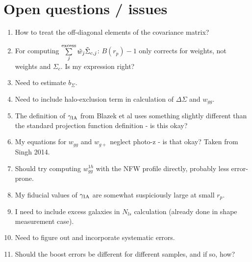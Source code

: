 \documentclass[onecolumn,amsmath,aps,fleqn, superscriptaddress]{revtex4}
\begin{document}
\section{Open questions / issues}
\begin{enumerate}
\item{How to treat the off-diagonal elements of the covariance matrix?}
\item{For computing $\sum\limits_{j}^{\rm excess} \tilde{w}_j \tilde{\Sigma}_{c,j}$: $B(r_p) - 1$ only corrects for weights, not weights and $\Sigma_c$. Is my expression right?}
\item{Need to estimate $b_{\Sigma}$.}
\item{Need to include halo-exclusion term in calculation of $\Delta \Sigma$ and $w_{gg}$.}
\item{The definition of $\gamma_{\rm IA}$ from Blazek et al uses something slightly different than the standard projection function definition - is this okay?}
\item{My equations for $w_{gg}$ and $w_{g+}$ neglect photo-z - is that okay? Taken from Singh 2014.}
\item{Should try computing $w_{gg}^{1h}$ with the NFW profile directly, probably less error-prone.}
\item{My fiducial values of $\gamma_{\rm IA}$ are somewhat suspiciously large at small $r_p$.}
\item{I need to include excess galaxies in $N_{ls}$ calculation (already done in shape measurement case).}
\item{Need to figure out and incorporate systematic errors.}
\item{Should the boost errors be different for different samples, and if so, how?}
\end{enumerate}











\end{document}
